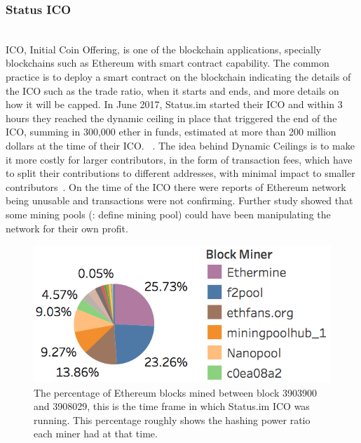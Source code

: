 \subsubsection{Status ICO} \hfill\\ %
\noindent ICO, Initial Coin Offering, is one of the blockchain applications, specially blockchains such as Ethereum with smart contract capability. The common practice is to deploy a smart contract on the blockchain indicating the details of the ICO such as the trade ratio, when it starts and ends, and more details on how it will be capped.
In June 2017, Status.im started their ICO and within 3 hours they reached the dynamic ceiling in place that triggered the end of the ICO, summing in 300,000 ether in funds, estimated at more than 200 million dollars at the time of their ICO. ~\cite{statusicoanalysis}. The idea behind Dynamic Ceilings is to make it more costly for larger contributors,  in the form of transaction fees, which have to split their contributions to different addresses, with minimal impact to smaller contributors~\cite{statuswhitepaper}.
On the time of the ICO there were reports of Ethereum network being unusable and transactions were not confirming. Further study showed that some mining pools (\todo: define mining pool) could have been manipulating the network for their own profit.



\begin{figure}[h]
\centering
\includegraphics[width=0.5\linewidth]{figures/Mining_pool_ratio.png}
\caption{The percentage of Ethereum blocks mined between block 3903900 and 3908029, this is the time frame in which Status.im ICO was running. This percentage roughly shows the hashing power ratio each miner had at that time. \label{fig:mining_pool_ratio}} %
\end{figure}

